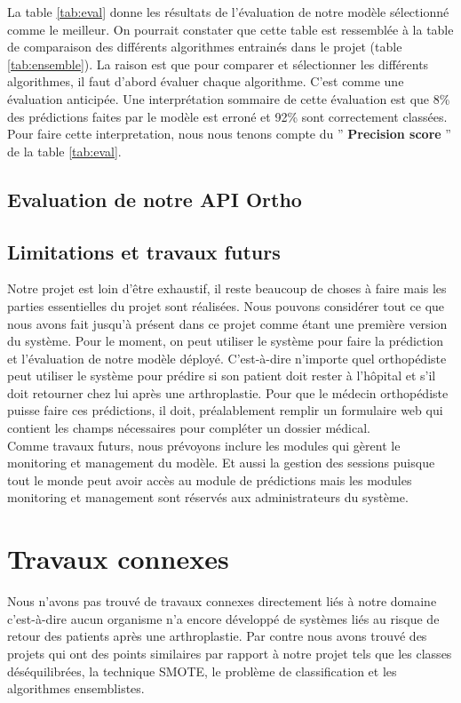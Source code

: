 \documentclass[12pt, french]{report}
\begin{document}
La table \ref{tab:eval} donne les résultats de l'évaluation de notre modèle sélectionné comme le meilleur. On pourrait constater que cette table est ressemblée à la table de comparaison des différents algorithmes entrainés dans le projet (table \ref{tab:ensemble}). La raison est que pour comparer et sélectionner les différents algorithmes, il faut d'abord évaluer chaque algorithme. C'est comme une évaluation anticipée. Une interprétation sommaire de cette évaluation est que 8\% des prédictions faites par le modèle est erroné et 92\% sont correctement classées. Pour faire cette interpretation, nous nous tenons compte du '' \textbf{Precision score} '' de la table \ref{tab:eval}. 

\section{Evaluation de notre API Ortho}

\section{Limitations et travaux futurs}
Notre projet est loin d'être exhaustif, il reste beaucoup de choses à faire mais les parties essentielles du projet sont réalisées. Nous pouvons considérer tout ce que nous avons fait jusqu'à présent dans ce projet comme étant une première version du système. Pour le moment, on peut utiliser le système pour faire la prédiction et l'évaluation de notre modèle déployé. C'est-à-dire n'importe quel orthopédiste peut utiliser le système pour prédire si son patient doit rester à l'hôpital et s'il doit retourner chez lui après une arthroplastie. Pour que le médecin orthopédiste puisse faire ces prédictions, il doit, préalablement remplir un formulaire web qui contient les champs nécessaires pour compléter un dossier médical.   \\

Comme travaux futurs, nous prévoyons inclure les modules qui gèrent le monitoring et management du modèle. Et aussi la gestion des sessions puisque tout le monde peut avoir accès au module de prédictions mais les modules monitoring et management sont réservés aux administrateurs du système.    
\newpage

\chapter{Travaux connexes}
Nous n'avons pas trouvé de travaux connexes directement liés à notre domaine c'est-à-dire aucun organisme n'a encore développé de systèmes liés au risque de retour des patients après une arthroplastie. Par contre nous avons trouvé des projets qui ont des points similaires par rapport à notre projet tels que les classes déséquilibrées, la technique SMOTE, le problème de classification et les algorithmes ensemblistes. \\
\end{document}
